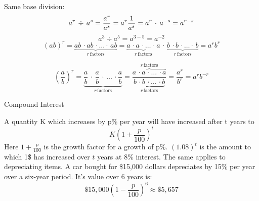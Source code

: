 \documentclass[12pt]{article}
\begin{document}
 \vspace{7pt}

Same base division:
\begin{equation*}
    a^r \, \div \, a^s=\frac{a^r}{a^s}=a^r\frac{1}{a^s}=a^r \, \cdot \, a^{-s}=a^{r-s}\\
\end{equation*}
\vspace{-60pt}
\begin{equation*}
    a^3 \div a^5=a^{3-5}=a^{-2}
\end{equation*}
\vspace{-20pt}
\begin{equation*}
    (ab)^r = \underbrace{ab \, \cdot ab \, \cdot \ldots \cdot \, ab}_{r \, \text{factors}} = \underbrace{a \, \cdot a \, \cdot \ldots \cdot \, a}_{r \, \text{factors}} \, \cdot \, \underbrace{b \, \cdot b \, \cdot \ldots \cdot \, b}_{r \, \text{factors}} = a^rb^r
\end{equation*}
\vspace{-15pt}

\begin{equation*}
    \left( \frac{a}{b} \right)^r = \underbrace{\frac{a}{b} \, \cdot \, \frac{a}{b} \, \cdot \, \ldots \, \cdot \frac{a}{b}}_{r \, \text{factors}} = \frac{\overbrace{a \, \cdot a \, \cdot \ldots \, \cdot a}^{r \, \text{factors}}}{\underbrace{b \, \cdot b \, \cdot \ldots \, \cdot b}_{r \, \text{factors}}}=\frac{a^r}{b^r}=a^rb^{-r}
\end{equation*}
\vspace{-15pt}

\large Compound Interest
\normalsize

A quantity K which increases by p\% per year will have increased after t years to
\begin{equation*}
    K \left(1+\frac{p}{100}\right)^t
\end{equation*}
Here $1 + \frac{p}{100}$ is the growth factor for a growth of p\%. $(1.08)^t$ is the amount to which 1\$ has increased over $t$ years at 8\% interest. The same applies to depreciating items. A car bought for \$15,000 dollars depreciates by 15\% per year over a six-year period. It's value over 6 years is:
\begin{equation*}
    \$15,000\left( 1- \frac{p}{100} \right)^6 \approx \$5,657
\end{equation*}
\end{document}
